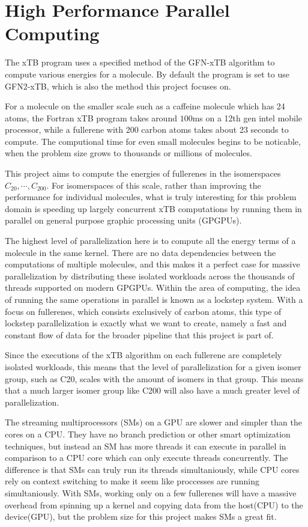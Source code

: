 
\section{High Performance Parallel Computing}

The xTB program uses a specified method of the GFN-xTB algorithm to compute various energies for a molecule. By default the program is set to use GFN2-xTB, which is also the method this project focuses on.

For a molecule on the smaller scale such as a caffeine molecule which has 24 atoms, the Fortran xTB program takes around $100$ms on a 12th gen intel mobile processor, while a fullerene with 200 carbon atoms takes about 23 seconds to compute. The computional time for even small molecules begins to be noticable, when the problem size grows to thousands or millions of molecules.

This project aims to compute the energies of fullerenes in the isomerspaces \(C_{20}, \cdots, C_{200} \). For isomerspaces of this scale, rather than improving the performance for individual molecules, what is truly interesting for this problem domain is speeding up largely concurrent xTB computations by running them in parallel on general purpose graphic processing units (GPGPUs).

The highest level of parallelization here is to compute all the energy terms of a molecule in the same kernel. There are no data dependencies between the computations of multiple molecules, and this makes it a perfect case for massive parallelization by distributing these isolated workloads across the thousands of threads supported on modern GPGPUs.
Within the area of computing, the idea of running the same operations in parallel is known as a lockstep system. With a focus on fullerenes, which consists exclusively of carbon atoms, this type of lockstep parallelization is exactly what we want to create, namely a fast and constant flow of data for the broader pipeline that this project is part of.

Since the executions of the xTB algorithm on each fullerene are completely isolated workloads, this means that the level of parallelization for a given isomer group, such as C20, scales with the amount of isomers in that group. This means that a much larger isomer group like C200 will also have a much greater level of parallelization.

The streaming multiprocessors (SMs) on a GPU are slower and simpler than the cores on a CPU. They have no branch prediction or other smart optimization techniques, but instead an SM has more threads it can execute in parallel in comparison to a CPU core which can only execute threads concurrently. The difference is that SMs can truly run its threads simultaniously, while CPU cores rely on context switching to make it seem like proccesses are running simultaniously. With SMs, working only on a few fullerenes will have a massive overhead from spinning up a kernel and copying data from the host(CPU) to the device(GPU), but the problem size for this project makes SMs a great fit.

